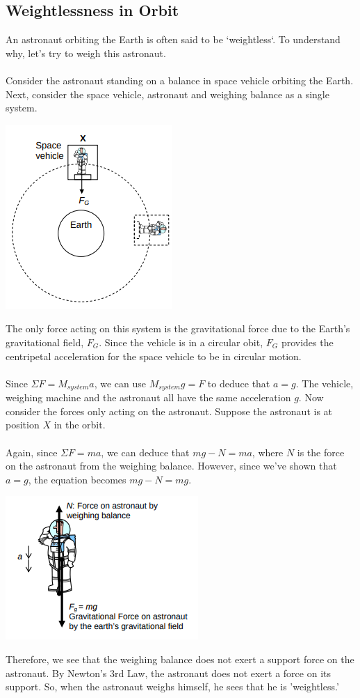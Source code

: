 \documentclass{article}
\begin{document}
\subsection{Weightlessness in Orbit}
An astronaut orbiting the Earth is often said to be `weightless`. To understand why, let's try to weigh this astronaut.
\\
\\Consider the astronaut standing on a balance in space vehicle orbiting the Earth. Next, consider the space vehicle, astronaut and weighing balance as a single system.
\begin{center}
    \includegraphics[scale=0.6]{assets/weighingAstronaut.png}
\end{center}\leavevmode
The only force acting on this system is the gravitational force due to the Earth's gravitational field, $F_G$. Since the vehicle is in a circular obit, $F_G$ provides the centripetal acceleration for the space vehicle to be in circular motion.
\\
\\Since $\Sigma F=M_{system}a$, we can use $M_{system}g=F$ to deduce that $a=g$. The vehicle, weighing machine and the astronaut all have the same acceleration $g$. Now consider the forces only acting on the astronaut. Suppose the astronaut is at position $X$ in the orbit.
\\
\\Again, since $\Sigma F=ma$, we can deduce that $mg-N=ma$, where $N$ is the force on the astronaut from the weighing balance.
However, since we've shown that $a=g$, the equation becomes $mg-N=mg$. 
\begin{center}
    \includegraphics[scale=0.6]{assets/weighingAstronaut2.png}
\end{center}\leavevmode
Therefore, we see that the weighing balance does not exert a support force on the astronaut. By Newton's 3rd Law, the astronaut does not exert a force on its support. So, when the astronaut weighs himself, he sees that he is 'weightless.'
\pagebreak
\end{document}
